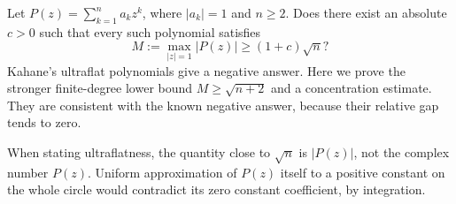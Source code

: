 Let $P(z)=\sum_{k=1}^n a_kz^k$, where $|a_k|=1$ and $n\ge2$. Does there exist an absolute $c>0$ such that every such polynomial satisfies
\[
 M:=\max_{|z|=1}|P(z)|\ge(1+c)\sqrt n?\tag{1}
\]
Kahane's ultraflat polynomials give a negative answer. Here we prove the stronger finite-degree lower bound $M\ge\sqrt{n+2}$ and a concentration estimate. They are consistent with the known negative answer, because their relative gap tends to zero.

When stating ultraflatness, the quantity close to $\sqrt n$ is $|P(z)|$, not the complex number $P(z)$. Uniform approximation of $P(z)$ itself to a positive constant on the whole circle would contradict its zero constant coefficient, by integration.

